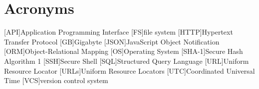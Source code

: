 \chapter*{Acronyms}
\begin{acronym}
    [API]{Application Programming Interface}
    [FS]{file system}
    [HTTP]{Hypertext Transfer Protocol}
    [GB]{Gigabyte}
    [JSON]{JavaScript Object Notification}
    [ORM]{Object-Relational Mapping}
    [OS]{Operating System}
    [SHA-1]{Secure Hash Algorithm 1}
    [SSH]{Secure Shell}
    [SQL]{Structured Query Language}
    [URL]{Uniform Resource Locator}
    [URLs]{Uniform Resource Locators}
    [UTC]{Coordinated Universal Time}
    [VCS]{version control system}
\end{acronym}
